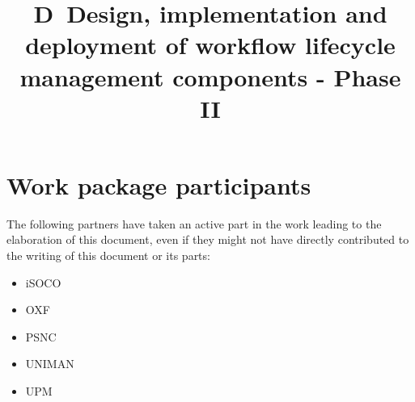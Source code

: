 \documentclass[a4paper, twoside, 11pt]{article}
\title{D\delid\ Design, implementation and deployment of workflow
  lifecycle management components - Phase II}
\begin{document}
\maketitle


\section*{Work package participants} The following partners have taken an active part in the work leading to the elaboration of this document, even if they might not have directly contributed to the writing of this document or its parts: %
\begin{itemize}
\item iSOCO
\item OXF
\item PSNC
\item UNIMAN
\item UPM
\end{itemize}
\end{document}
